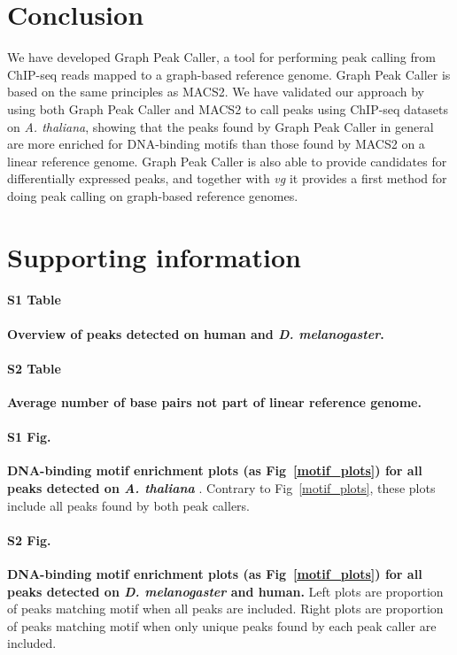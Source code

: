 \documentclass[10pt,letterpaper]{article}
\begin{document}
\section*{Conclusion}
We have developed Graph Peak Caller, a tool for performing peak calling from ChIP-seq reads mapped to a graph-based reference genome. Graph Peak Caller is based on the same principles as MACS2. We have validated our approach by using both Graph Peak Caller and MACS2 to call peaks using ChIP-seq datasets on \emph{A. thaliana}, showing that the peaks found by Graph Peak Caller in general are more enriched for DNA-binding motifs than those found by MACS2 on a linear reference genome. Graph Peak Caller is also able to provide candidates for differentially expressed peaks, and together with \emph{vg} it provides a first method for doing peak calling on graph-based reference genomes.

\section*{Supporting information}

\paragraph*{S1 Table}
\label{S1_Table}
{\bf Overview of peaks detected on human and \emph{D. melanogaster}.}

\paragraph*{S2 Table}
\label{S2_Table}
{\bf Average number of base pairs not part of linear reference genome.}

\paragraph*{S1 Fig.}
\label{S1_Fig}
{\bf DNA-binding motif enrichment plots (as Fig~\ref{motif_plots})  for all peaks detected on \emph{A. thaliana} }. Contrary to Fig~\ref{motif_plots}, these plots include all peaks found by both peak callers.

\paragraph*{S2 Fig.}
\label{S2s_Fig}
{\bf DNA-binding motif enrichment plots (as Fig~\ref{motif_plots}) for all peaks detected on \emph{D. melanogaster} and human.} Left plots are proportion of peaks matching motif when all peaks are included. Right plots are proportion of peaks matching motif when only unique peaks found by each peak caller are included.
\end{document}
